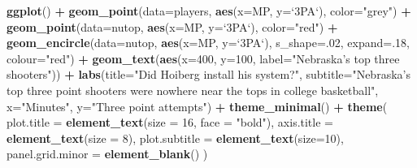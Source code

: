 \documentclass[]{book}
\newenvironment{Shaded}{\begin{snugshade}}{\end{snugshade}}
\newcommand{\DataTypeTok}[1]{\textcolor[rgb]{0.13,0.29,0.53}{#1}}
\newcommand{\DecValTok}[1]{\textcolor[rgb]{0.00,0.00,0.81}{#1}}
\newcommand{\KeywordTok}[1]{\textcolor[rgb]{0.13,0.29,0.53}{\textbf{#1}}}
\newcommand{\NormalTok}[1]{#1}
\newcommand{\OperatorTok}[1]{\textcolor[rgb]{0.81,0.36,0.00}{\textbf{#1}}}
\newcommand{\StringTok}[1]{\textcolor[rgb]{0.31,0.60,0.02}{#1}}
\begin{document}
\begin{Shaded}
\begin{Highlighting}[]
\KeywordTok{ggplot}\NormalTok{() }\OperatorTok{+}\StringTok{ }\KeywordTok{geom_point}\NormalTok{(}\DataTypeTok{data=}\NormalTok{players, }\KeywordTok{aes}\NormalTok{(}\DataTypeTok{x=}\NormalTok{MP, }\DataTypeTok{y=}\StringTok{`}\DataTypeTok{3PA}\StringTok{`}\NormalTok{), }\DataTypeTok{color=}\StringTok{"grey"}\NormalTok{) }\OperatorTok{+}\StringTok{ }\KeywordTok{geom_point}\NormalTok{(}\DataTypeTok{data=}\NormalTok{nutop, }\KeywordTok{aes}\NormalTok{(}\DataTypeTok{x=}\NormalTok{MP, }\DataTypeTok{y=}\StringTok{`}\DataTypeTok{3PA}\StringTok{`}\NormalTok{), }\DataTypeTok{color=}\StringTok{"red"}\NormalTok{) }\OperatorTok{+}\StringTok{ }\KeywordTok{geom_encircle}\NormalTok{(}\DataTypeTok{data=}\NormalTok{nutop, }\KeywordTok{aes}\NormalTok{(}\DataTypeTok{x=}\NormalTok{MP, }\DataTypeTok{y=}\StringTok{`}\DataTypeTok{3PA}\StringTok{`}\NormalTok{), }\DataTypeTok{s_shape=}\NormalTok{.}\DecValTok{02}\NormalTok{, }\DataTypeTok{expand=}\NormalTok{.}\DecValTok{18}\NormalTok{, }\DataTypeTok{colour=}\StringTok{"red"}\NormalTok{) }\OperatorTok{+}
\StringTok{  }\KeywordTok{geom_text}\NormalTok{(}\KeywordTok{aes}\NormalTok{(}\DataTypeTok{x=}\DecValTok{400}\NormalTok{, }\DataTypeTok{y=}\DecValTok{100}\NormalTok{, }\DataTypeTok{label=}\StringTok{"Nebraska's top three shooters"}\NormalTok{)) }\OperatorTok{+}\StringTok{ }
\StringTok{  }\KeywordTok{labs}\NormalTok{(}\DataTypeTok{title=}\StringTok{"Did Hoiberg install his system?"}\NormalTok{, }\DataTypeTok{subtitle=}\StringTok{"Nebraska's top three point shooters were nowhere near the tops in college basketball"}\NormalTok{, }\DataTypeTok{x=}\StringTok{"Minutes"}\NormalTok{, }\DataTypeTok{y=}\StringTok{"Three point attempts"}\NormalTok{) }\OperatorTok{+}\StringTok{ }
\StringTok{  }\KeywordTok{theme_minimal}\NormalTok{() }\OperatorTok{+}\StringTok{ }
\StringTok{  }\KeywordTok{theme}\NormalTok{(}
    \DataTypeTok{plot.title =} \KeywordTok{element_text}\NormalTok{(}\DataTypeTok{size =} \DecValTok{16}\NormalTok{, }\DataTypeTok{face =} \StringTok{"bold"}\NormalTok{),}
    \DataTypeTok{axis.title =} \KeywordTok{element_text}\NormalTok{(}\DataTypeTok{size =} \DecValTok{8}\NormalTok{), }
    \DataTypeTok{plot.subtitle =} \KeywordTok{element_text}\NormalTok{(}\DataTypeTok{size=}\DecValTok{10}\NormalTok{), }
    \DataTypeTok{panel.grid.minor =} \KeywordTok{element_blank}\NormalTok{()}
\NormalTok{    )}
\end{Highlighting}
\end{Shaded}
\end{document}
